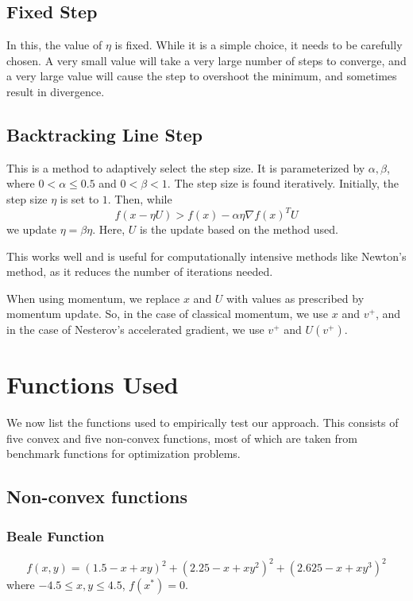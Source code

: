 \documentclass{article}
\begin{document}
\subsection{Fixed Step}
In this, the value of $\eta$ is fixed. While it is a simple choice, it needs to be carefully chosen. A very small value will take a very large number of steps to converge, and a very large value will cause the step to overshoot the minimum, and sometimes result in divergence.

\subsection{Backtracking Line Step}
This is a method to adaptively select the step size. It is parameterized by $\alpha,\beta$, where $0<\alpha\le0.5$ and $0<\beta<1$. The step size is found iteratively. Initially, the step size $\eta$ is set to $1$. Then, while
\begin{equation}
f(x-\eta U) > f(x) - \alpha \eta \nabla f(x)^T U
\end{equation}
we update $\eta = \beta \eta$. Here, $U$ is the update based on the method used.

This works well and is useful for computationally intensive methods like Newton's method, as it reduces the number of iterations needed.

When using momentum, we replace $x$ and $U$ with values as prescribed by momentum update. So, in the case of classical momentum, we use $x$ and $v^+$, and in the case of Nesterov's accelerated gradient, we use $v^+$ and $U(v^+)$.

\section{Functions Used}\label{functions}
We now list the functions used to empirically test our approach. This consists of five convex and five non-convex functions, most of which are taken from benchmark functions for optimization problems.

\subsection{Non-convex functions}

\subsubsection{Beale Function}
\begin{equation}
f(x,y) = (1.5 - x + xy)^2 + (2.25 - x + xy^2)^2 + (2.625 - x + xy^3)^2	
\end{equation}
where $-4.5\le x,y \le 4.5$, $f(x^*)=0$.
\end{document}
